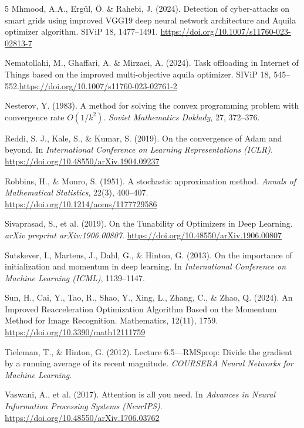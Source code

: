 \documentclass[10pt,twocolumn]{article}
\begin{document}
\begin{thebibliography}{5}
Mhmood, A.A., Ergül, Ö. \& Rahebi, J. (2024). Detection of cyber-attacks on smart grids using improved VGG19 deep neural network architecture and Aquila optimizer algorithm. SIViP 18, 1477–1491. \url{https://doi.org/10.1007/s11760-023-02813-7}

Nematollahi, M., Ghaffari, A. \& Mirzaei, A. (2024). Task offloading in Internet of Things based on the improved multi-objective aquila optimizer. SIViP 18, 545–552.\url{https://doi.org/10.1007/s11760-023-02761-2}



Nesterov, Y. (1983). A method for solving the convex programming problem with convergence rate \( O(1/k^2) \). \textit{Soviet Mathematics Doklady}, 27, 372--376.

Reddi, S. J., Kale, S., \& Kumar, S. (2019). On the convergence of Adam and beyond. In \textit{International Conference on Learning Representations (ICLR)}. \url{https://doi.org/10.48550/arXiv.1904.09237}

Robbins, H., \& Monro, S. (1951). A stochastic approximation method. \textit{Annals of Mathematical Statistics}, 22(3), 400--407. \url{https://doi.org/10.1214/aoms/1177729586}

Sivaprasad, S., et al. (2019). On the Tunability of Optimizers in Deep Learning. \textit{arXiv preprint arXiv:1906.00807}. \url{https://doi.org/10.48550/arXiv.1906.00807}

Sutskever, I., Martens, J., Dahl, G., \& Hinton, G. (2013). On the importance of initialization and momentum in deep learning. In \textit{International Conference on Machine Learning (ICML)}, 1139--1147.

Sun, H., Cai, Y., Tao, R., Shao, Y., Xing, L., Zhang, C., \& Zhao, Q. (2024). An Improved Reacceleration Optimization Algorithm Based on the Momentum Method for Image Recognition. Mathematics, 12(11), 1759. \url{https://doi.org/10.3390/math12111759}

Tieleman, T., \& Hinton, G. (2012). Lecture 6.5—RMSprop: Divide the gradient by a running average of its recent magnitude. \textit{COURSERA Neural Networks for Machine Learning}.

Vaswani, A., et al. (2017). Attention is all you need. In \textit{Advances in Neural Information Processing Systems (NeurIPS)}. \url{https://doi.org/10.48550/arXiv.1706.03762}


\end{thebibliography}
\end{document}
